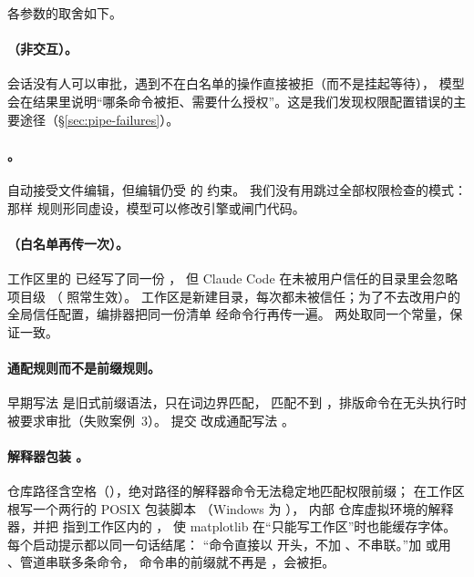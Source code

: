 各参数的取舍如下。

\paragraph{（非交互）。}会话没有人可以审批，遇到不在白名单的操作直接被拒（而不是挂起等待），
模型会在结果里说明“哪条命令被拒、需要什么授权”。这是我们发现权限配置错误的主要途径（\S\ref{sec:pipe-failures}）。

\paragraph{。}自动接受文件编辑，但编辑仍受  的  约束。
我们没有用跳过全部权限检查的模式：那样  规则形同虚设，模型可以修改引擎或闸门代码。

\paragraph{（白名单再传一次）。}工作区里的  已经写了同一份 ，
但 Claude Code 在未被用户信任的目录里会忽略项目级 （ 照常生效）。
工作区是新建目录，每次都未被信任；为了不去改用户的全局信任配置，编排器把同一份清单  经命令行再传一遍。
两处取同一个常量，保证一致。

\paragraph{通配规则而不是前缀规则。}早期写法  是旧式前缀语法，只在词边界匹配，
匹配不到 ，排版命令在无头执行时被要求审批（失败案例~3）。
提交  改成通配写法 。

\paragraph{解释器包装 。}仓库路径含空格（），绝对路径的解释器命令无法稳定地匹配权限前缀；
 在工作区根写一个两行的 POSIX 包装脚本 （Windows 为 ），
内部  仓库虚拟环境的解释器，并把  指到工作区内的 ，
使 matplotlib 在“只能写工作区”时也能缓存字体。每个启动提示都以同一句话结尾：
“命令直接以  开头，不加 、不串联。”加  或用 \code{\&\&}、管道串联多条命令，
命令串的前缀就不再是 ，会被拒。

